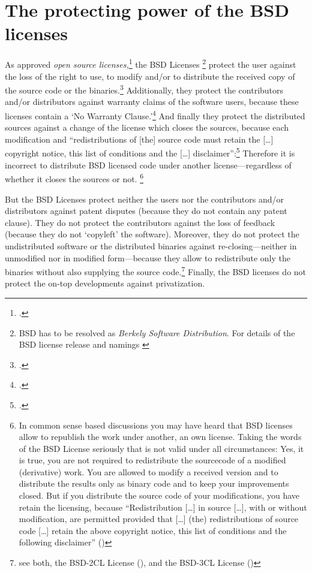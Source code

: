 \section{\texorpdfstring{The protecting power of the}{The} BSD licenses}

As approved \emph{open source licenses,}\footcite[cf.][\nopage wp]{OSI2012b} the
BSD Licenses%
  \footnote{BSD has to be resolved as \emph{Berkely Software Distribution}. 
  For details of the BSD license release and namings
  \cite[cf.][\nopage wp.\ editorial]{BsdLicense3Clause}} 
protect the user against
the loss of the right to use, to modify and/or to distribute the received copy
of the source code or the binaries.\footcite[cf.][\nopage wp. §1ff]{OSI2012a}
Additionally, they protect the contributors and/or distributors against warranty
claims of the software users, because these licenses contain a `No Warranty
Clause.'\footcite[one for all version cf.][\nopage wp]{BsdLicense2Clause} And
finally they protect the distributed sources against a change of the license
which closes the sources, because each modification and \enquote{redistributions
of [the] source code must retain the [\ldots] copyright notice, this list of
conditions and the [\ldots] disclaimer}:\footcite[cf.][\nopage
wp]{BsdLicense2Clause} Therefore it is incorrect to distribute BSD licensed
code under another license---regardless of whether it closes the sources or
not.%
  \footnote{In common sense based discussions you may have heard that BSD
  licenses allow to republish the work under another, an own license. Taking the
  words of the BSD License seriously that is not valid under all circumstances:
  Yes, it is true, you are not required to redistribute the sourcecode of a
  modified (derivative) work. You are allowed to modify a received version and to
  distribute the results only as binary code and to keep your improvements closed.
  But if you distribute the source code of your modifications, you have retain the
  licensing, because \enquote{Redistribution [\ldots] in source [\ldots], with or
  without modification, are permitted provided that [\ldots] (the) redistributions
  of source code [\ldots] retain the above copyright notice, this list of
  conditions and the following disclaimer} (\cite[cf.][\nopage
  wp]{BsdLicense2Clause})}

But the BSD Licenses protect neither the users nor the contributors
and/or distributors against patent disputes (because they do not contain any
patent clause). They do not protect the contributors against the loss of
feedback (because they do not `copyleft' the software). Moreover, they do not
protect the undistributed software or the distributed binaries against
re-closing---neither in unmodified nor in modified form---because they
allow to redistribute only the binaries without also supplying the source
code.\footnote{see both, the BSD-2CL License (\cite[cf.][\nopage
wp]{BsdLicense2Clause}), and the BSD-3CL License (\cite[cf.][\nopage
wp]{BsdLicense3Clause})} Finally, the BSD licenses do not protect the on-top
developments against privatization.

